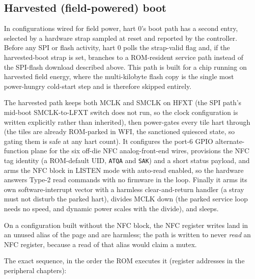 \subsection{Harvested (field-powered) boot} \label{ss:multicore-harvested}

In configurations wired for field power, hart 0's boot path has a second entry, selected by a hardware strap sampled at reset and reported by the  controller. Before any SPI or flash activity, hart 0 polls the strap-valid flag and, if the harvested-boot strap is set, branches to a ROM-resident service path instead of the SPI-flash download described above. This path is built for a chip running on harvested field energy, where the multi-kilobyte flash copy is the single most power-hungry cold-start step and is therefore skipped entirely.

The harvested path keeps both MCLK and SMCLK on HFXT (the SPI path's mid-boot SMCLK-to-LFXT switch does not run, so the clock configuration is written explicitly rather than inherited), then power-gates every tile hart through  (the tiles are already ROM-parked in WFI, the sanctioned quiesced state, so gating them is safe at any hart count). It configures the port-6 GPIO alternate-function plane for the six off-die NFC analog-front-end wires, provisions the NFC tag identity (a ROM-default UID, \texttt{ATQA} and \texttt{SAK}) and a short status payload, and arms the NFC block in LISTEN mode with auto-read enabled, so the hardware answers Type-2 read commands with no firmware in the loop. Finally it arms its own software-interrupt vector with a harmless clear-and-return handler (a stray  must not disturb the parked hart), divides MCLK down (the parked service loop needs no speed, and dynamic power scales with the divide), and sleeps.

On a configuration built without the NFC block, the NFC register writes land in an unused alias of the  page and are harmless; the path is written to never \textit{read} an NFC register, because a read of that alias would claim a mutex.

The exact sequence, in the order the ROM executes it (register addresses in the peripheral chapters):

